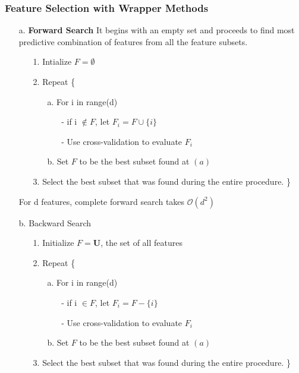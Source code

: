 \documentclass[12pt,a4paper,titlepage,landscape]{book}
\begin{document}
	\subsubsection{Feature Selection with Wrapper Methods}
	\begin{enumerate}
		\item[a.] \textbf{Forward Search}
		It begins with an empty set and proceeds to find most predictive combination of features from all the feature subsets.
		\begin{enumerate}
			\item[1.] Intialize $F = \emptyset$
			\item[2.] Repeat \{
			\begin{enumerate}
				\item[a.] For i in range(d)
				\begin{enumerate}
					\item[-] if i $\notin F$, let $F_i=F\cup\{i\}$
					\item[-] Use cross-validation to evaluate $F_i$
				\end{enumerate}
				\item[b.] Set $F$ to be the best subset found at $(a)$
			\end{enumerate}
			\item[3.] Select the best subset that was found during the entire procedure.
		\} 
		\end{enumerate}
	For d features, complete forward search takes $\mathcal{O}(d^2)$\\
		\item[b.] Backward Search
		\begin{enumerate}
			\item[1.] Initialize $F = \mathbf{U} $, the set of all features
			\item[2.] Repeat \{
			\begin{enumerate}
				\item[a.] For i in range(d)
				\begin{enumerate}
					\item[-] if i $\in F$, let $F_i=F - \{i\}$
					\item[-] Use cross-validation to evaluate $F_i$
				\end{enumerate}
				\item[b.] Set $F$ to be the best subset found at $(a)$
			\end{enumerate}
			\item[3.] Select the best subset that was found during the entire procedure.
			\}
		\end{enumerate}
	\end{enumerate}
\end{document}
